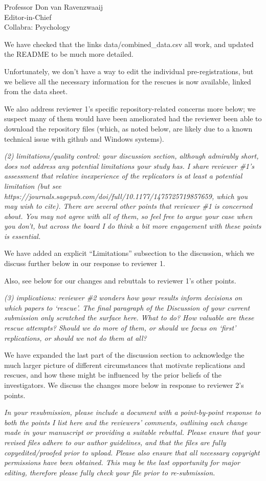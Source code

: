 \documentclass{stanfordletter}
\newcounter{section}
\newcommand{\theysaid}[1]{\begin{leftbar} \noindent 
		\textsl{ #1}\end{leftbar}}
\begin{document}
\begin{letter}{Professor Don van Ravenzwaaij \\ Editor-in-Chief \\ Collabra: Psychology }
	
	We have checked that the links data/combined\_data.csv
	all work, and updated the README to be much more detailed. 
	
	Unfortunately, we don't have a way to edit the individual pre-registrations, but we believe all the necessary information for the rescues is now available, linked from the data sheet. 
	
	We also address reviewer 1's specific repository-related concerns more below; we suspect many of them would have been ameliorated had the reviewer been able to download the repository files (which, as noted below, are likely due to a known technical issue with github and Windows systems).  
	
	\theysaid{(2) limitations/quality control: your discussion section, although admirably short, does not address any potential limitations your study has. I share reviewer \#1’s assessment that relative inexperience of the replicators is at least a potential limitation (but see https://journals.sagepub.com/doi/full/10.1177/1475725719857659, which you may wish to cite). There are several other points that reviewer \#1 is concerned about. You may not agree with all of them, so feel free to argue your case when you don’t, but across the board I do think a bit more engagement with these points is essential.}
	
	
	We have added an explicit ``Limitations'' subsection to the discussion, which we discuss further below in our response to reviewer 1. 
	
	Also, see below for our changes and rebuttals to reviewer 1's other points.
	
	\theysaid{(3) implications: reviewer \#2 wonders how your results inform decisions on which papers to ‘rescue’. The final paragraph of the Discussion of your current submission only scratched the surface here. What to do? How valuable are these rescue attempts? Should we do more of them, or should we focus on ‘first’ replications, or should we not do them at all?}
	
	We have expanded the last part of the discussion section to acknowledge the much larger picture of different circumstances that motivate replications and rescues, and how these might be influenced by the prior beliefs of the investigators. We discuss the changes more below in response to reviewer 2's points. 
	
	\theysaid{In your resubmission, please include a document with a point-by-point response to both the points I list here and the reviewers’ comments, outlining each change made in your manuscript or providing a suitable rebuttal. Please ensure that your revised files adhere to our author guidelines, and that the files are fully copyedited/proofed prior to upload. Please also ensure that all necessary copyright permissions have been obtained. This may be the last opportunity for major editing, therefore please fully check your file prior to re-submission.}
	

\end{letter}
\end{document}
